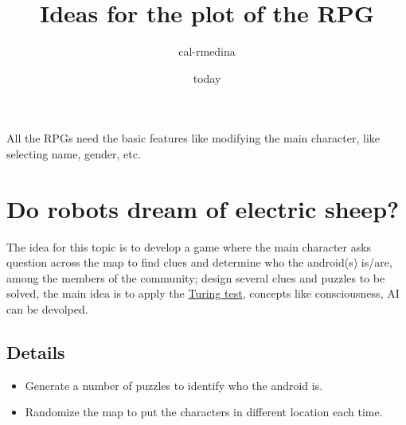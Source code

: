 \documentclass{article}
\title{Ideas for the plot of the RPG}
\date{today}
\author{cal-rmedina}
\begin{document}
  \maketitle

All the RPGs need the basic features like modifying the main character, like
selecting name, gender, etc.

\section{Do robots dream of electric sheep?}

The idea for this topic is to develop a game where the main character asks
question across the map to find clues and determine who the android(s) is/are,
among the members of the community; design several clues and puzzles to be
solved, the main idea is to apply the
\href{https://en.wikipedia.org/wiki/Turing_test}{Turing test}, concepts like
consciousness, AI can be devolped.

\subsection{Details}

\begin{itemize}
  \item Generate a number of puzzles to identify who the android is.
  \item Randomize the map to put the characters in different location each time.
\end{itemize}
\end{document}
